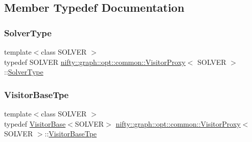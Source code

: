 \subsection{Member Typedef Documentation}
\mbox{\label{classnifty_1_1graph_1_1opt_1_1common_1_1VisitorProxy_adf9a1e3e32a8a5ed163501888a817eff}} 
\subsubsection{\texorpdfstring{Solver\+Type}{SolverType}}
{\footnotesize\ttfamily template$<$class S\+O\+L\+V\+ER $>$ \\
typedef S\+O\+L\+V\+ER \hyperlink{classnifty_1_1graph_1_1opt_1_1common_1_1VisitorProxy}{nifty\+::graph\+::opt\+::common\+::\+Visitor\+Proxy}$<$ S\+O\+L\+V\+ER $>$\+::\hyperlink{classnifty_1_1graph_1_1opt_1_1common_1_1VisitorProxy_adf9a1e3e32a8a5ed163501888a817eff}{Solver\+Type}}

\mbox{\label{classnifty_1_1graph_1_1opt_1_1common_1_1VisitorProxy_a6828e049755dc2f473d15558c488e33b}} 
\subsubsection{\texorpdfstring{Visitor\+Base\+Tpe}{VisitorBaseTpe}}
{\footnotesize\ttfamily template$<$class S\+O\+L\+V\+ER $>$ \\
typedef \hyperlink{classnifty_1_1graph_1_1opt_1_1common_1_1VisitorBase}{Visitor\+Base}$<$S\+O\+L\+V\+ER$>$ \hyperlink{classnifty_1_1graph_1_1opt_1_1common_1_1VisitorProxy}{nifty\+::graph\+::opt\+::common\+::\+Visitor\+Proxy}$<$ S\+O\+L\+V\+ER $>$\+::\hyperlink{classnifty_1_1graph_1_1opt_1_1common_1_1VisitorProxy_a6828e049755dc2f473d15558c488e33b}{Visitor\+Base\+Tpe}}




